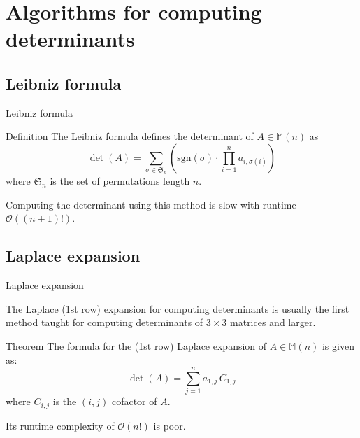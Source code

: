 \documentclass[handout]{beamer}
\begin{document}
\section{Algorithms for computing determinants}

\subsection{Leibniz formula}

\begin{frame}{Leibniz formula}

    \begin{block}{Definition}
        The Leibniz formula defines the determinant of $A \in \mathbb{M}(n)$ as
        \[
            \det(A) = \sum_{\sigma \in \mathfrak{S}_n}
            \left( \text{sgn}(\sigma) \cdot \prod_{i=1}^n a_{i,\sigma(i)} \right)
        \]
        where $\mathfrak{S}_n$ is the set of permutations length $n$.
    \end{block}

    \pause{}

    Computing the determinant using this method is slow with runtime $\mathcal{O}((n+1)!)$.

\end{frame}

\subsection{Laplace expansion}

\begin{frame}{Laplace expansion}

    The Laplace (1st row) expansion for computing determinants is usually the first method taught
    for computing determinants of $3 \times 3$ matrices and larger.

    \pause{}

    \begin{block}{Theorem}
        The formula for the (1st row) Laplace expansion of $A \in \mathbb{M}(n)$
        is given as:
        \[
            \det(A) = \sum_{j=1}^n a_{1,j}\, C_{1,j}
        \]
        where $C_{i,j}$ is the $(i, j)$ cofactor of $A$.
    \end{block}

    \pause{}

    Its runtime complexity of $\mathcal{O}(n!)$ is poor.

\end{frame}
\end{document}
